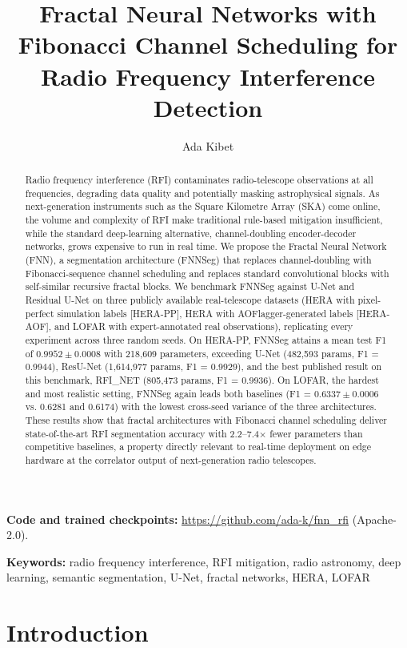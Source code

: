 \documentclass[11pt]{article}
\title{Fractal Neural Networks with Fibonacci Channel Scheduling for Radio Frequency Interference Detection}
\author{Ada Kibet}
\date{}
\begin{document}
\maketitle

\noindent \textbf{Code and trained checkpoints:} \url{https://github.com/ada-k/fnn_rfi} (Apache-2.0).

\begin{abstract}
Radio frequency interference (RFI) contaminates radio-telescope observations at all frequencies, degrading data quality and potentially masking astrophysical signals. As next-generation instruments such as the Square Kilometre Array (SKA) come online, the volume and complexity of RFI make traditional rule-based mitigation insufficient, while the standard deep-learning alternative, channel-doubling encoder-decoder networks, grows expensive to run in real time. We propose the Fractal Neural Network (FNN), a segmentation architecture (FNNSeg) that replaces channel-doubling with Fibonacci-sequence channel scheduling and replaces standard convolutional blocks with self-similar recursive fractal blocks. We benchmark FNNSeg against U-Net and Residual U-Net on three publicly available real-telescope datasets (HERA with pixel-perfect simulation labels [HERA-PP], HERA with AOFlagger-generated labels [HERA-AOF], and LOFAR with expert-annotated real observations), replicating every experiment across three random seeds. On HERA-PP, FNNSeg attains a mean test F1 of $0.9952 \pm 0.0008$ with 218,609 parameters, exceeding U-Net (482,593 params, F1 = 0.9944), ResU-Net (1,614,977 params, F1 = 0.9929), and the best published result on this benchmark, RFI\_NET \citep{dutoit2023} (805,473 params, F1 = 0.9936). On LOFAR, the hardest and most realistic setting, FNNSeg again leads both baselines (F1 = $0.6337 \pm 0.0006$ vs. 0.6281 and 0.6174) with the lowest cross-seed variance of the three architectures. These results show that fractal architectures with Fibonacci channel scheduling deliver state-of-the-art RFI segmentation accuracy with 2.2--7.4$\times$ fewer parameters than competitive baselines, a property directly relevant to real-time deployment on edge hardware at the correlator output of next-generation radio telescopes.
\end{abstract}

\noindent \textbf{Keywords:} radio frequency interference, RFI mitigation, radio astronomy, deep learning, semantic segmentation, U-Net, fractal networks, HERA, LOFAR

\section{Introduction}
\end{document}
